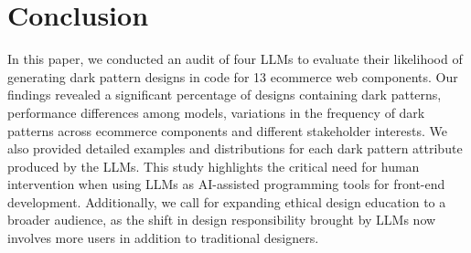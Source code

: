 \section{Conclusion}
In this paper, we conducted an audit of four LLMs to evaluate their likelihood of generating dark pattern designs in code for 13 ecommerce web components. Our findings revealed a significant percentage of designs containing dark patterns, performance differences among models, variations in the frequency of dark patterns across ecommerce components and different stakeholder interests. We also provided detailed examples and distributions for each dark pattern attribute produced by the LLMs. This study highlights the critical need for human intervention when using LLMs as AI-assisted programming tools for front-end development. Additionally, we call for expanding ethical design education to a broader audience, as the shift in design responsibility brought by LLMs now involves more users in addition to traditional designers.